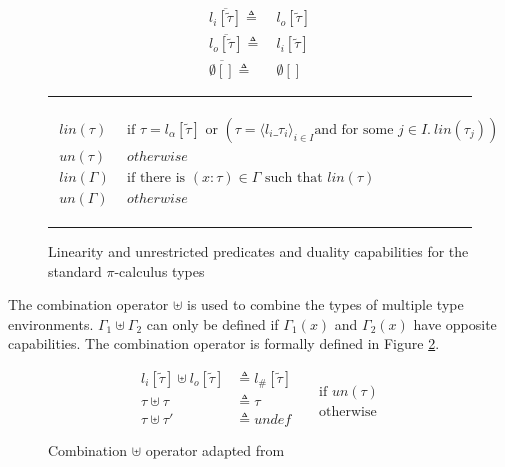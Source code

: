 \begin{figure}[h]
    \centering
    \begin{equation*}
        \begin{split}
            \overline{l_i[\widetilde{\tau}]} \triangleq & \:l_o[\widetilde{\tau}] \\
            \overline{l_o[\widetilde{\tau}]} \triangleq & \:l_i[\widetilde{\tau}] \\
            \overline{\emptyset[]} \triangleq & \:\emptyset[]
        \end{split}
    \end{equation*}
    \noindent\rule{12cm}{0.8pt}
    \begin{align*}
        \begin{split}
            lin(\tau) \:\: & \text{if } \tau = l_\alpha[\widetilde{\tau}] \text{ or } (\tau = \langle l_i\_\tau_i \rangle_{i \in I} \text{and for some } j \in I. \: lin(\tau_j)) \\
            un(\tau) \:\:& otherwise\\
            lin(\Gamma) \:\:& \text{if there is } (x : \tau) \in \Gamma \text{ such that } lin(\tau)\\
            un(\Gamma) \:\:& otherwise 
        \end{split}
    \end{align*}
    \noindent\rule{12cm}{0.8pt}
    \caption{Linearity and unrestricted predicates and duality capabilities for the standard $\pi$-calculus types}
    \label{fig:linDualLinpi}
\end{figure}

The combination operator $\uplus$ is used to combine the types of multiple type environments. $\Gamma_1 \uplus \Gamma_2$ can only be defined if $\Gamma_1(x)$ and $\Gamma_2(x)$ have opposite capabilities. The combination operator is formally defined in Figure \ref{fig:combLin}.

\begin{figure}[h]
    \centering
    \begin{equation*}
        \begin{split}
            l_i[\widetilde{\tau}] \uplus l_o[\widetilde{\tau}] & \triangleq l_\#[\widetilde{\tau}] \\
            \tau \uplus \tau & \triangleq \tau  \\
            \tau \uplus \tau' & \triangleq undef 
        \end{split}
        \begin{split}
            & \\
            & \text{ if } un(\tau) \\
            & \text{ otherwise}
        \end{split}
    \end{equation*}
    \caption{Combination $\uplus$ operator adapted from \citep{dardha2017session}}
    \label{fig:combLin} 
\end{figure}

